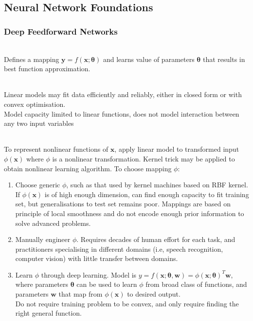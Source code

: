 \subsection{Neural Network Foundations}

\subsubsection{Deep Feedforward Networks}

\begin{remark} \\
Defines a mapping $\bm{y} = f(\bm{x}; \bm{\theta})$ and learns value of parameters $\bm{\theta}$ that results in best function approximation.
\end{remark}

\begin{remark} \\
Linear models may fit data efficiently and reliably, either in closed form or with convex optimisation.\\
Model capacity limited to linear functions, does not model interaction between any two input variables
\end{remark}

\begin{remark} \\
To represent nonlinear functions of $\bm{x}$, apply linear model to transformed input $\phi(\bm{x})$ where $\phi$ is a nonlinear transformation. Kernel trick may be applied to obtain nonlinear learning algorithm. To choose mapping $\phi$:
\begin{enumerate}[label=\roman*.]
\setlength{\itemsep}{0pt}
\item Choose generic $\phi$, such as that used by kernel machines based on RBF kernel.\\
If $\phi(\bm{x})$ is of high enough dimension, can find enough capacity to fit training set, but generalisations to test set remains poor. Mappings are based on principle of local smoothness and do not encode enough prior information to solve advanced problems.
\item Manually engineer $\phi$. Requires decades of human effort for each task, and practitioners specialising in different domains (i.e, speech recognition, computer vision) with little transfer between domains.
\item Learn $\phi$ through deep learning. Model is $y = f(\bm{x}; \bm{\theta}, \bm{w}) = \phi(\bm{x}; \bm{\theta})^T \bm{w}$, where parameters $\bm{\theta}$ can be used to learn $\phi$ from broad class of functions, and parameters $\bm{w}$ that map from $\phi(\bm{x})$ to desired output.\\
Do not require training problem to be convex, and only require finding the right general function.
\end{enumerate}
\end{remark}

